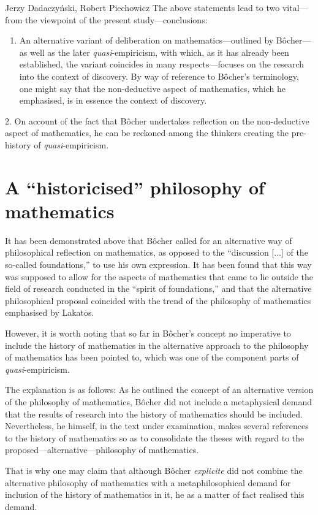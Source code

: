 \begin{artengenv}{Jerzy Dadaczyński, Robert Piechowicz}
The above statements lead to two vital---from the viewpoint of the present study---conclusions:

\begin{enumerate}
\item An alternative variant of deliberation on mathematics---outlined by Bôcher---as well as the later \textit{quasi}-empiricism, with which, as it has already been established, the variant coincides in many respects---focuses on the research into the context of discovery. By way of reference to Bôcher's terminology, one might say that the non-deductive aspect of mathematics, which he emphasised, is in essence the context of discovery.
\end{enumerate}
2. On account of the fact that Bôcher undertakes reflection on the non-deductive aspect of mathematics, he can be reckoned among the thinkers creating the pre-history of \textit{quasi}-empiricism.

\section{A ``historicised'' philosophy of mathematics}
It has been demonstrated above that Bôcher called for an alternative way of philosophical reflection on mathematics, as opposed to the ``discussion [...] of the so-called foundations,'' to use his own expression. It has been found that this way was supposed to allow for the aspects of mathematics that came to lie outside the field of research conducted in the ``spirit of foundations,'' and that the alternative philosophical proposal coincided with the trend of the philosophy of mathematics emphasised by Lakatos.

However, it is worth noting that so far in Bôcher's concept no imperative to include the history of mathematics in the alternative approach to the philosophy of mathematics has been pointed to, which was one of the component parts of \textit{quasi}-empiricism.

The explanation is as follows: As he outlined the concept of an alternative version of the philosophy of mathematics, Bôcher did not include a metaphysical demand that the results of research into the history of mathematics should be included. Nevertheless, he himself, in the text under examination, makes several references to the history of mathematics so as to consolidate the theses with regard to the proposed---alternative---philosophy of mathematics.

That is why one may claim that although Bôcher \textit{explicite} did not combine the alternative philosophy of mathematics with a metaphilosophical demand for inclusion of the history of mathematics in it, he as a matter of fact realised this demand.


\end{artengenv}
